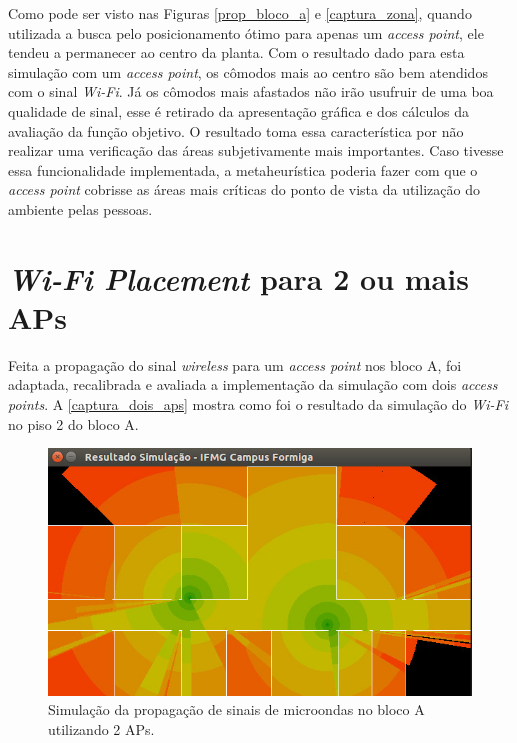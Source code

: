 \documentclass[
	12pt,				%
	twoside,			%
	a4paper,			%
	english,			%
	french,				%
	spanish,			%
	brazil				%
	]{abntex2}
\begin{document}
Como pode ser visto nas Figuras \ref{prop_bloco_a} e \ref{captura_zona},
quando utilizada a busca pelo posicionamento ótimo para apenas um
\emph{access point}, ele tendeu a permanecer ao centro da planta. Com o
resultado dado para esta simulação com um \emph{access point}, os
cômodos mais ao centro são bem atendidos com o sinal \emph{Wi-Fi}. Já os
cômodos mais afastados não irão usufruir de uma boa qualidade de sinal,
esse é retirado da apresentação gráfica e dos cálculos da avaliação da
função objetivo. O resultado toma essa característica por não realizar
uma verificação das áreas subjetivamente mais importantes. Caso tivesse
essa funcionalidade implementada, a metaheurística poderia fazer com que
o \emph{access point} cobrisse as áreas mais críticas do ponto de vista
da utilização do ambiente pelas pessoas.

\section{\texorpdfstring{\emph{Wi-Fi Placement} para 2 ou mais
APs}{Wi-Fi Placement para 2 ou mais APs}}\label{wi-fi-placement-para-2-ou-mais-aps}

Feita a propagação do sinal \emph{wireless} para um \emph{access point}
nos bloco A, foi adaptada, recalibrada e avaliada a implementação da
simulação com dois \emph{access points}. A \autoref{captura_dois_aps}
mostra como foi o resultado da simulação do \emph{Wi-Fi} no piso 2 do
bloco A.

\begin{figure}[ht]
    \caption{\label{captura_dois_aps} Simulação da propagação de sinais de microondas no bloco A utilizando 2 APs.
    }
    \begin{center}
        \includegraphics[scale=0.6]{imagens/captura-2-aps-2.jpg}
    \end{center}
\end{figure}
\end{document}
